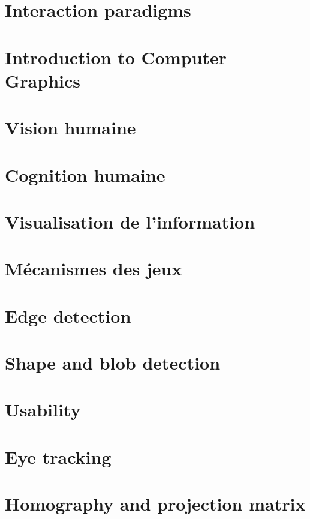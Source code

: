 \documentclass[a4paper,11pt]{article}
\theoremstyle{theorem-style}  %
\theoremstyle{definition-style}
\begin{document}
\section{Interaction paradigms}

\section{Introduction to Computer Graphics}

\section{Vision humaine}

\section{Cognition humaine}

\section{Visualisation de l'information}

\section{M\'ecanismes des jeux}

\section{Edge detection}

\section{Shape and blob detection}

\section{Usability}

\section{Eye tracking}

\section{Homography and projection matrix}

\end{document}
